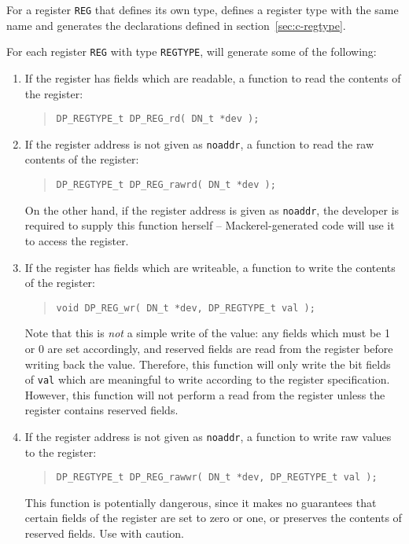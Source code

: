 \documentclass[a4paper,11pt,twoside]{report}
\begin{document}
For a register \texttt{REG} that defines its own type, \Mac defines
a register type with the same name and generates the declarations
defined in section~\ref{sec:c-regtype}. 

For each register \texttt{REG} with type \texttt{REGTYPE}, \Mac will
generate some of the following:

\begin{enumerate}

\item If the register has fields which are readable, a function to
  read the contents of the register:
  \begin{quote}
    \texttt{DP\_REGTYPE\_t DP\_REG\_rd( DN\_t *dev );}
  \end{quote}

\item If the register address is not given as \texttt{noaddr}, a function to
  read the raw contents of the register:
  \begin{quote}
    \texttt{DP\_REGTYPE\_t DP\_REG\_rawrd( DN\_t *dev );}
  \end{quote}
  On the other hand, if the register address is given as
  \texttt{noaddr}, the developer is required to supply this function
  herself -- Mackerel-generated code will use it to access the
  register. 

\item If the register has fields which are writeable, a function to
  write the contents of the register:
  \begin{quote}
    \texttt{void DP\_REG\_wr( DN\_t *dev, DP\_REGTYPE\_t val );}
  \end{quote}
  Note that this is \emph{not} a simple write of the value: any fields
  which must be 1 or 0 are set accordingly, and reserved fields are
  read from the register before writing back the value.  Therefore,
  this function will only write the bit fields of \texttt{val} which
  are meaningful to write according to the register specification.
  However, this function will not perform a read from the register
  unless the register contains reserved fields. 

\item If the register address is not given as \texttt{noaddr}, a function to
  write raw values to the register:
  \begin{quote}
    \texttt{DP\_REGTYPE\_t DP\_REG\_rawwr( DN\_t *dev, DP\_REGTYPE\_t val );}
  \end{quote}
  This function is potentially dangerous, since it makes no guarantees
  that certain fields of the register are set to zero or one, or
  preserves the contents of reserved fields.  Use with caution. 


\end{enumerate}
\end{document}
